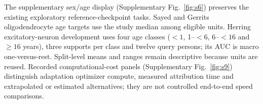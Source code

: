 The supplementary sex/age display (Supplementary Fig.~\ref{fig:s6}) preserves the existing exploratory reference-checkpoint tasks. Sayed and Gerrits oligodendrocyte age targets use the study median among eligible units. Herring excitatory-neuron development uses four age classes ($<1$, 1--$<6$, 6--$<16$ and $\geq16$ years), three supports per class and twelve query persons; its AUC is macro one-versus-rest. Split-level means and ranges remain descriptive because units are reused. Recorded computational-cost panels (Supplementary Fig.~\ref{fig:s9}) distinguish adaptation optimizer compute, measured attribution time and extrapolated or estimated alternatives; they are not controlled end-to-end speed comparisons.

